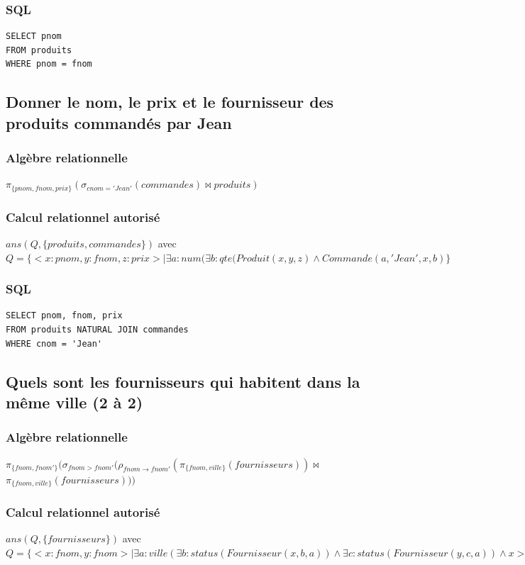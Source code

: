 \documentclass[10pt,a4paper,twoside]{article}
\begin{document}
\subsubsection{SQL}
\begin{verbatim}
SELECT pnom 
FROM produits
WHERE pnom = fnom
\end{verbatim}

\subsection{Donner le nom, le prix et le fournisseur des produits commandés par Jean}
\subsubsection{Algèbre relationnelle}
$\pi_{\{pnom, fnom, prix\}}(\sigma_{cnom='Jean'}(commandes) \bowtie produits)$
\subsubsection{Calcul relationnel autorisé}
$ans(Q,\{produits, commandes\})$ avec $Q=\{<x:pnom,y:fnom,z:prix> \mid \exists a:num(\exists b:qte(Produit(x,y,z) \wedge Commande(a,'Jean',x,b)\}$
\subsubsection{SQL}
\begin{verbatim}
SELECT pnom, fnom, prix
FROM produits NATURAL JOIN commandes
WHERE cnom = 'Jean'
\end{verbatim}


\subsection{Quels sont les fournisseurs qui habitent dans la même ville (2 à 2)}
\subsubsection{Algèbre relationnelle}
$\pi_{\{fnom, fnom'\}}(\sigma_{fnom>fnom'}(\rho_{fnom \rightarrow fnom'}(\pi_{\{fnom,ville\}}(fournisseurs)) \bowtie$ \\
$ \pi_{\{fnom,ville\}}(fournisseurs)))$
\subsubsection{Calcul relationnel autorisé}
$ans(Q,\{fournisseurs\})$ avec $Q=\{<x:fnom,y:fnom> \mid \exists a:ville(\exists b:status(Fournisseur(x,b,a)) \wedge\exists c:status(Fournisseur(y,c,a)) \wedge x>y)\}$
\end{document}
